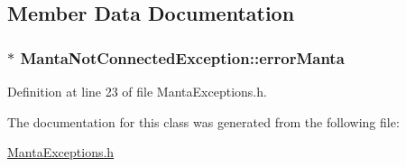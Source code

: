 \subsection{\-Member \-Data \-Documentation}
\hypertarget{classMantaNotConnectedException_ac67b724c9d54f3b6f2e970baf0d5db78}{
\subsubsection[{error\-Manta}]{$\ast$ {\bf \-Manta\-Not\-Connected\-Exception\-::error\-Manta}}}\label{classMantaNotConnectedException_ac67b724c9d54f3b6f2e970baf0d5db78}


\-Definition at line 23 of file \-Manta\-Exceptions.\-h.



\-The documentation for this class was generated from the following file\-:\begin{DoxyCompactItemize}
\item 
\hyperlink{MantaExceptions_8h}{\-Manta\-Exceptions.\-h}\end{DoxyCompactItemize}
